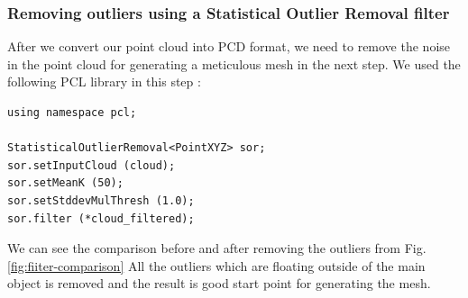 \documentclass[runningheads,a4paper]{llncs}
\begin{document}
\subsubsection{Removing outliers using a Statistical Outlier Removal filter}
After we convert our point cloud into PCD format, we need to remove the noise in the point cloud for generating a meticulous mesh in the next step. We used the following PCL library in this step \cite{9}:
\begin{lstlisting}
using namespace pcl;

StatisticalOutlierRemoval<PointXYZ> sor;
sor.setInputCloud (cloud);
sor.setMeanK (50);
sor.setStddevMulThresh (1.0);
sor.filter (*cloud_filtered); 
\end{lstlisting}
We can see the comparison before and after removing the outliers from Fig.  \ref{fig:fiiter-comparison} All the outliers which are floating outside of the main object is removed and the result is good start point for generating the mesh.
\end{document}
